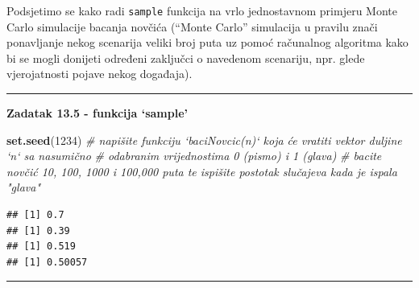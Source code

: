 \documentclass[]{book}
\newenvironment{Shaded}{\begin{snugshade}}{\end{snugshade}}
\newcommand{\KeywordTok}[1]{\textcolor[rgb]{0.13,0.29,0.53}{\textbf{#1}}}
\newcommand{\DataTypeTok}[1]{\textcolor[rgb]{0.13,0.29,0.53}{#1}}
\newcommand{\DecValTok}[1]{\textcolor[rgb]{0.00,0.00,0.81}{#1}}
\newcommand{\StringTok}[1]{\textcolor[rgb]{0.31,0.60,0.02}{#1}}
\newcommand{\CommentTok}[1]{\textcolor[rgb]{0.56,0.35,0.01}{\textit{#1}}}
\newcommand{\ControlFlowTok}[1]{\textcolor[rgb]{0.13,0.29,0.53}{\textbf{#1}}}
\newcommand{\OperatorTok}[1]{\textcolor[rgb]{0.81,0.36,0.00}{\textbf{#1}}}
\newcommand{\NormalTok}[1]{#1}
\theoremstyle{definition}
\theoremstyle{definition}
\theoremstyle{definition}
\theoremstyle{remark}
\begin{document}
Podsjetimo se kako radi \texttt{sample} funkcija na vrlo jednostavnom
primjeru Monte Carlo simulacije bacanja novčića (``Monte Carlo''
simulacija u pravilu znači ponavljanje nekog scenarija veliki broj puta
uz pomoć računalnog algoritma kako bi se mogli donijeti određeni
zaključci o navedenom scenariju, npr. glede vjerojatnosti pojave nekog
događaja).

\begin{center}\rule{0.5\linewidth}{\linethickness}\end{center}

\textbf{Zadatak 13.5 - funkcija `sample'}

\begin{Shaded}
\begin{Highlighting}[]
\KeywordTok{set.seed}\NormalTok{(}\DecValTok{1234}\NormalTok{)}
\CommentTok{# napišite funkciju `baciNovcic(n)` koja će vratiti vektor duljine `n` sa nasumično }
\CommentTok{# odabranim vrijednostima 0 (pismo) i 1 (glava)}
\CommentTok{# bacite novčić 10, 100, 1000 i 100,000 puta te ispišite postotak slučajeva kada je ispala "glava"}
\end{Highlighting}
\end{Shaded}

\begin{Shaded}
\end{Shaded}

\begin{verbatim}
## [1] 0.7
## [1] 0.39
## [1] 0.519
## [1] 0.50057
\end{verbatim}

\begin{center}\rule{0.5\linewidth}{\linethickness}\end{center}
\end{document}
